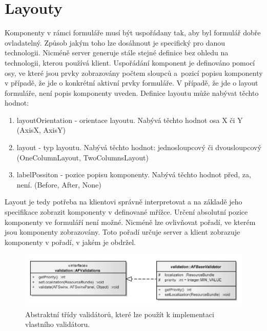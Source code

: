 \section{Layouty}
Komponenty v rámci formuláře musí být uspořádany tak, aby byl formulář dobře ovladatelný. Způsob jakým toho lze dosáhnout je specifický pro danou technologii. Nicméně server generuje stále stejné definice bez ohledu na technologii, kterou používá klient. Uspořádání komponent je definováno pomocí osy, ve které jsou prvky zobrazovány počtem sloupců a~pozicí popisu komponenty v případě, že jde o konkrétní aktivní prvky formuláře. V případě, že jde o layout formuláře, není popis komponenty uveden. Definice layoutu může nabývat těchto hodnot:
\begin{enumerate}
\item layoutOrientation - orientace layoutu. Nabývá těchto hodnot osa X či Y (AxisX, AxisY)
\item layout - typ layoutu. Nabývá těchto hodnot: jednosloupcový či dvousloupcový (OneColumnLayout, TwoColumnsLayout)
\item labelPossiton - pozice popisu komponenty. Nabývá těchto hodnot před, za, není. (Before, After, None)
\end{enumerate}
Layout je tedy potřeba na klientovi správně interpretovat a na základě jeho specifikace zobrazit komponenty v definované mřížce. Určení absolutní pozice komponenty ve formuláří není možné. Nicméně lze ovlivňovat pořadí, ve kterém jsou komponenty zobrazovány. Toto pořadí určuje server a klient zobrazuje komponenty v pořadí, v jakém je obdržel. 
\begin{figure}[h!]
\includegraphics{images/validationModel}
\caption{Abstraktní třídy validátorů, které lze použít k implementaci vlastního validátoru.}
\label{img:validationModel}
\end{figure}

